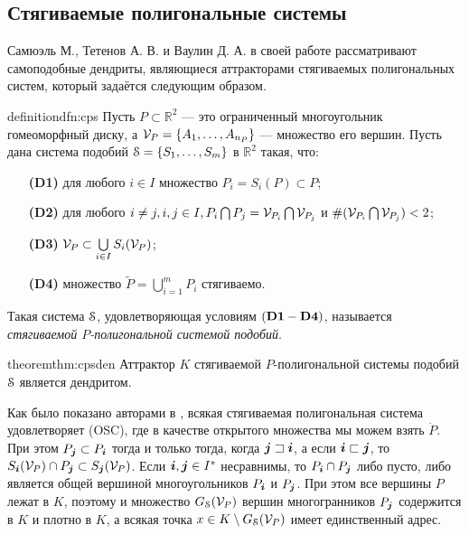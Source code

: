 \subsection{Стягиваемые полигональные системы}

Самюэль М., Тетенов А. В. и Ваулин Д. А. в своей работе \cite{STV2017} рассматривают самоподобные дендриты, являющиеся аттракторами стягиваемых полигональных систем, который задаётся следующим образом.


\begin{restatethis}{definition}{dfn:cps} \label{dfn:cps}
Пусть $P\subset\mathbb{R}^2$ --- это ограниченный многоугольник гомеоморфный диску, а $ {\mathcal V}_P= \{A_1, \ldots, A_{n_P}\}$ --- множество его вершин.
Пусть дана система подобий ${\EuScript S} = \{S_1, \ldots, S_m\}$ в ${\mathbb{R}}^2$ такая, что:
\begin{itemize}[nolistsep]
\item[{\bf (D1)}] для любого $i \in I$ множество $P_i = S_i (P) \subset P$; 
\item[{\bf (D2)}] для любого $i \ne j, i, j \in I, P_i \bigcap P_j =  {\mathcal V}_{P_i} \bigcap  {\mathcal V}_{P_j}$ и $\#({\mathcal V}_{P_i} \bigcap  {\mathcal V}_{P_j})<2$;  
\item[{\bf (D3)}] ${\mathcal V}_P \subset \bigcup \limits_{i \in I} S_i ({\mathcal V}_P)$;
\item[{\bf (D4)}] множество $\widetilde P = \bigcup \limits_{i = 1} ^m P_i$ стягиваемо.
\end{itemize} 
Такая система  ${\EuScript S}$, удовлетворяющая условиям $\bf (D1 - D4)$, называется  {\em стягиваемой $P$-полигональной системой подобий}.
\end{restatethis}

\begin{restatethis}{theorem}{thm:cpsden} %
Аттрактор $K$  стягиваемой  $P$-полигональной системы подобий ${\EuScript S}$ является дендритом.
\end{restatethis}

Как было показано авторами в \cite[Theorem 4]{TSV2017}, всякая стягиваемая полигональная система удовлетворяет (OSC), где  в качестве открытого множества мы можем взять $\dot P$.
При этом $P_{\bm{j}}\subset P_{\bm{i}}$ тогда и только тогда, когда  ${\bm{j}}\sqsupset{\bm{i}}$, а если ${\bm{i}}\sqsubset{\bm{j}}$, то  $ S_{\bm{i}}({\mathcal V}_P)\cap P_{\bm{j}}\subset S_{\bm{j}}({\mathcal V}_P)$. 
Если ${\bm{i}},{\bm{j}}\in I^*$ несравнимы, то $P_{\bm{i}}\cap P_{\bm{j}}$ либо пусто, либо является  общей вершиной многоугольников $P_{\bm{i}}$ и  $P_{\bm{j}}$. 
При этом все вершины $P$ лежат в $K$, поэтому и множество $G_{\EuScript S}({\mathcal V}_P)$ вершин многогранников $P_{\bm{j}}$ содержится в $K$ и плотно в $K$, а всякая точка $x\in K\setminus G_{\EuScript S}({\mathcal V}_P)$ имеет единственный адрес.

